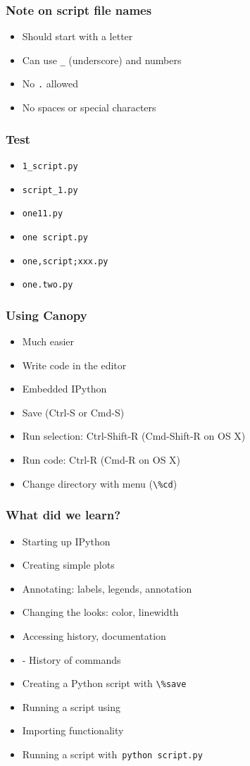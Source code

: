 \documentclass[14pt,compress]{beamer}
\newcounter{time}
\newcommand{\inctime}[1]{\addtocounter{time}{#1}{\tiny \thetime\ m}}
\newcommand{\typ}[1]{\lstinline{#1}}
\newcommand{\kwrd}[1]{ \texttt{\textbf{\color{blue}{#1}}}  }
\begin{document}
\begin{frame}[fragile]
  \frametitle{Note on script file names}
  \begin{itemize}
  \item Should start with a letter
  \item Can use \typ{_} (underscore) and numbers
  \item No \typ{.} allowed
  \item No spaces or special characters
  \end{itemize}
\end{frame}

\begin{frame}[fragile]
  \frametitle{Test}
  \begin{itemize}
  \item \typ{1_script.py}
  \item \typ{script_1.py}
  \item \typ{one11.py}
  \item \typ{one script.py}
  \item \typ{one,script;xxx.py}
  \item \typ{one.two.py}
  \end{itemize}
\end{frame}

\begin{frame}
  \frametitle{Using Canopy}
  \begin{itemize}
  \item Much easier
  \item Write code in the editor
  \item Embedded IPython
  \item Save (Ctrl-S or Cmd-S)
  \item Run selection: Ctrl-Shift-R (Cmd-Shift-R on OS X)
  \item Run code: Ctrl-R (Cmd-R on OS X)
  \item Change directory with menu (\typ{\%cd})
  \end{itemize}
  \inctime{5}
\end{frame}


\begin{frame}[fragile]
  \frametitle{What did we learn?}
  \begin{itemize}
    \item Starting up IPython
    \item Creating simple plots
    \item Annotating: labels, legends, annotation
    \item Changing the looks: color, linewidth
    \item Accessing history, documentation
    \item \kwrd{\%hist} - History of commands
    \item Creating a Python script with \typ{\%save}
    \item Running a script using \kwrd{\%run -i}
    \item Importing functionality
    \item Running a script with\ \typ{python script.py}
  \end{itemize}
\end{frame}
\end{document}
